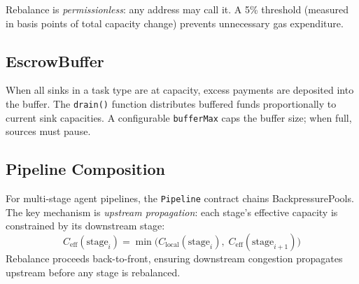 Rebalance is \emph{permissionless}: any address may call it. A 5\% threshold
(measured in basis points of total capacity change) prevents unnecessary gas
expenditure.

\subsection{EscrowBuffer}

When all sinks in a task type are at capacity, excess payments are deposited
into the buffer. The \texttt{drain()} function distributes buffered funds
proportionally to current sink capacities. A configurable \texttt{bufferMax}
caps the buffer size; when full, sources must pause.

\subsection{Pipeline Composition}

For multi-stage agent pipelines, the \texttt{Pipeline} contract chains
BackpressurePools. The key mechanism is \emph{upstream propagation}:
each stage's effective capacity is constrained by its downstream stage:
\begin{equation}
C_{\text{eff}}(\text{stage}_i) = \min\bigl(C_{\text{local}}(\text{stage}_i),\;
C_{\text{eff}}(\text{stage}_{i+1})\bigr)
\end{equation}
Rebalance proceeds back-to-front, ensuring downstream congestion propagates
upstream before any stage is rebalanced.
